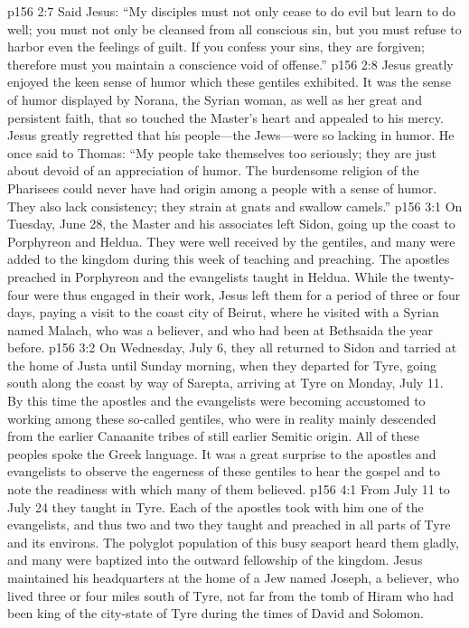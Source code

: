 \vs p156 2:7 Said Jesus: \textcolor{ubdarkred}{“My disciples must not only cease to do evil but learn to do well; you must not only be cleansed from all conscious sin, but you must refuse to harbor even the feelings of guilt. If you confess your sins, they are forgiven; therefore must you maintain a conscience void of offense.”}
\vs p156 2:8 Jesus greatly enjoyed the keen sense of humor which these gentiles exhibited. It was the sense of humor displayed by Norana, the Syrian woman, as well as her great and persistent faith, that so touched the Master’s heart and appealed to his mercy. Jesus greatly regretted that his people---the Jews---were so lacking in humor. He once said to Thomas: \textcolor{ubdarkred}{“My people take themselves too seriously; they are just about devoid of an appreciation of humor. The burdensome religion of the Pharisees could never have had origin among a people with a sense of humor. They also lack consistency; they strain at gnats and swallow camels.”}
\vs p156 3:1 On Tuesday, June 28, the Master and his associates left Sidon, going up the coast to Porphyreon and Heldua. They were well received by the gentiles, and many were added to the kingdom during this week of teaching and preaching. The apostles preached in Porphyreon and the evangelists taught in Heldua. While the twenty\hyp{}four were thus engaged in their work, Jesus left them for a period of three or four days, paying a visit to the coast city of Beirut, where he visited with a Syrian named Malach, who was a believer, and who had been at Bethsaida the year before.\plusone
\vs p156 3:2 On Wednesday, July 6, they all returned to Sidon and tarried at the home of Justa until Sunday morning, when they departed for Tyre, going south along the coast by way of Sarepta, arriving at Tyre on Monday, July 11. By this time the apostles and the evangelists were becoming accustomed to working among these so\hyp{}called gentiles, who were in reality mainly descended from the earlier Canaanite tribes of still earlier Semitic origin. All of these peoples spoke the Greek language. It was a great surprise to the apostles and evangelists to observe the eagerness of these gentiles to hear the gospel and to note the readiness with which many of them believed.
\vs p156 4:1 From July 11 to July 24 they taught in Tyre. Each of the apostles took with him one of the evangelists, and thus two and two they taught and preached in all parts of Tyre and its environs. The polyglot population of this busy seaport heard them gladly, and many were baptized into the outward fellowship of the kingdom. Jesus maintained his headquarters at the home of a Jew named Joseph, a believer, who lived three or four miles south of Tyre, not far from the tomb of Hiram who had been king of the city\hyp{}state of Tyre during the times of David and Solomon.
